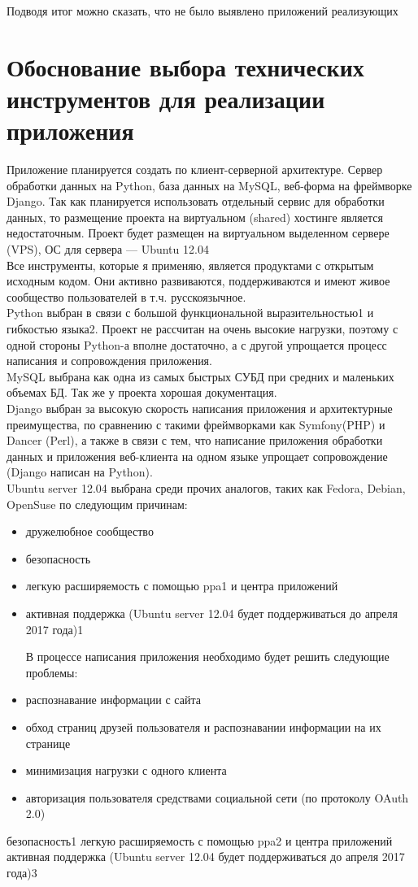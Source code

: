 Подводя итог можно сказать, что не было выявлено приложений реализующих 

\section{Обоснование выбора технических инструментов для реализации приложения}
Приложение планируется создать по клиент-серверной архитектуре. Сервер обработки данных на Python, база данных на MySQL, веб-форма на фреймворке Django. Так как планируется использовать отдельный сервис для обработки данных, то размещение проекта на виртуальном (shared) хостинге является недостаточным. Проект будет размещен на виртуальном выделенном сервере (VPS), ОС для сервера — Ubuntu 12.04 \\
Все инструменты, которые я применяю, является продуктами с открытым исходным кодом. Они активно развиваются, поддерживаются и имеют живое сообщество пользователей в т.ч. русскоязычное.\\ 
Python выбран в связи с большой функциональной выразительностью1 и гибкостью языка2. Проект не рассчитан на очень высокие нагрузки, поэтому с одной стороны Python-а вполне достаточно, а с другой упрощается процесс написания и сопровождения приложения. \\
MySQL выбрана как одна из самых быстрых СУБД при средних и маленьких объемах БД. Так же у проекта хорошая документация.\\
Django выбран за высокую скорость написания приложения и архитектурные преимущества, по сравнению с такими фреймворками как Symfony(PHP) и Dancer (Perl), а также в связи с тем, что написание приложения обработки данных и приложения веб-клиента на одном языке упрощает сопровождение (Django написан на Python).\\
Ubuntu server 12.04 выбрана среди прочих аналогов, таких как Fedora, Debian, OpenSuse по следующим причинам:\\
	\begin{itemize}
	\item дружелюбное сообщество
	\item безопасность
	\item легкую расширяемость с помощью ppa1 и центра приложений
	\item активная поддержка (Ubuntu server 12.04 будет поддерживаться до апреля 2017 года)1
	
	В процессе написания приложения необходимо будет решить следующие проблемы:
	\item распознавание информации с сайта
	\item обход страниц друзей пользователя и распознавании информации на их странице
	\item минимизация нагрузки с одного клиента
	\item авторизация пользователя средствами социальной сети (по протоколу OAuth 2.0)
	
	\end{itemize}

безопасность1
легкую расширяемость с помощью ppa2 и центра приложений
активная поддержка (Ubuntu server 12.04 будет поддерживаться до апреля 2017 года)3


